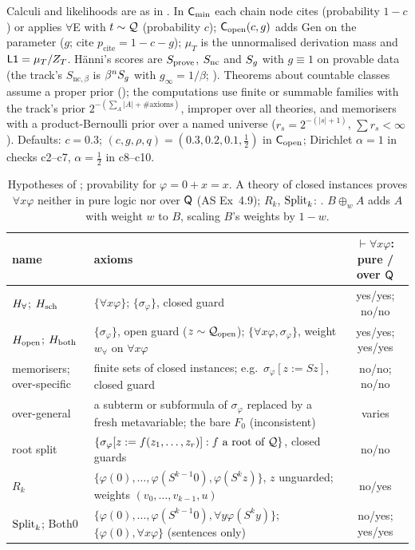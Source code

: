 Calculi and likelihoods are as in . In $\mathsf{C}_{\min}$ each chain node cites (probability $1-c$) or applies $\forall$E with $t\sim\mathcal{Q}$ (probability $c$); $\mathsf{C}_{\mathrm{open}}(c,g)$ adds Gen on the parameter ($g$; cite $p_{\mathrm{cite}}=1-c-g$); $\mu_T$ is the unnormalised derivation mass and $\mathord{\mathsf{L1}}=\mu_T/Z_T$. H\"anni's scores are $S_{\mathrm{prove}}$, $S_{\mathrm{nc}}$ and $S_{g}$ with $g\equiv1$ on provable data (the track's $S_{\mathrm{nc},\beta}$ is $\beta^nS_{g}$ with $g_\infty=1/\beta$; ). Theorems about countable classes assume a proper prior (); the computations use finite or summable families with the track's prior $2^{-(\sum_A\lvert A\rvert+\#\text{axioms})}$, improper over all theories, and memorisers with a product-Bernoulli prior over a named universe ($r_s=2^{-(\lvert s\rvert+1)}$, $\sum r_s<\infty$). Defaults: $c=0.3$; $(c,g,\rho,q)=(0.3,0.2,0.1,\tfrac12)$ in $\mathsf{C}_{\mathrm{open}}$; Dirichlet $\alpha=1$ in checks c2--c7, $\alpha=\tfrac12$ in c8--c10.

\begin{table}[t]
\centering\footnotesize
\begin{tabularx}{\textwidth}{@{}l>{\raggedright\arraybackslash}X c@{}}
\toprule
name & axioms & $\vdash\forall x\varphi$: pure / over $\mathsf{Q}$\\
\midrule
$H_{\forall}$; $H_{\mathrm{sch}}$ & $\{\forall x\varphi\}$; $\{\sigma_\varphi\}$, closed guard & yes/yes; no/no\\
$H_{\mathrm{open}}$; $H_{\mathrm{both}}$ & $\{\sigma_\varphi\}$, open guard ($z\sim\mathcal{Q}_{\mathrm{open}}$); $\{\forall x\varphi,\sigma_\varphi\}$, weight $w_\forall$ on $\forall x\varphi$ & yes/yes; yes/yes\\
memorisers; over-specific & finite sets of closed instances; e.g.\ $\sigma_\varphi[z:=Sz]$, closed guard & no/no; no/no\\
over-general & a subterm or subformula of $\sigma_\varphi$ replaced by a fresh metavariable; the bare $F_0$ (inconsistent) & varies\\
root split & $\{\sigma_\varphi[z:=f(z_1,\dots,z_r)]:f\text{ a root of }\mathcal{Q}\}$, closed guards & no/no\\
$R_k$ & $\{\varphi(0),\dots,\varphi(S^{k-1}0),\varphi(S^kz)\}$, $z$ unguarded; weights $(v_0,\dots,v_{k-1},u)$ & no/yes\\
$\mathrm{Split}_k$; Both0 & $\{\varphi(0),\dots,\varphi(S^{k-1}0),\forall y\varphi(S^ky)\}$; $\{\varphi(0),\forall x\varphi\}$ (sentences only) & no/yes; yes/yes\\
\bottomrule
\end{tabularx}
\caption{Hypotheses of ; provability for $\varphi=0+x=x$. A theory of closed instances proves $\forall x\varphi$ neither in pure logic nor over $\mathsf{Q}$ (AS Ex~4.9); $R_k$, $\mathrm{Split}_k$: . $B\oplus_wA$ adds $A$ with weight $w$ to $B$, scaling $B$'s weights by $1-w$.}
\label{tab:univ:hyp}
\end{table}

